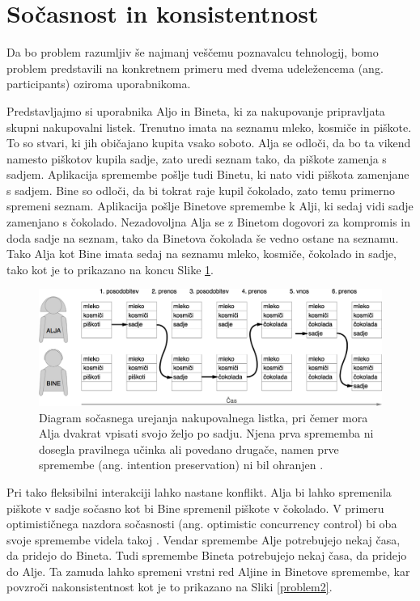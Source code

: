 \documentclass[a4paper, 12pt, twoside]{book}
\begin{document}
\section{Sočasnost in konsistentnost}
\label{sec:con}

Da bo problem razumljiv še najmanj veščemu poznavalcu tehnologij, bomo problem predstavili na konkretnem primeru \cite{problem} med dvema udeležencema (ang. participants) oziroma uporabnikoma.

Predstavljajmo si uporabnika Aljo in Bineta, ki za nakupovanje pripravljata skupni nakupovalni listek. Trenutno imata na seznamu mleko, kosmiče in piškote. To so stvari, ki jih običajano kupita vsako soboto. Alja se odloči, da bo ta vikend namesto piškotov kupila sadje, zato uredi seznam tako, da piškote zamenja s sadjem. Aplikacija spremembe pošlje tudi Binetu, ki nato vidi piškota zamenjane s sadjem. Bine so odloči, da bi tokrat raje kupil čokolado, zato temu primerno spremeni seznam. Aplikacija pošlje Binetove spremembe k Alji, ki sedaj vidi sadje zamenjano s čokolado. Nezadovoljna Alja se z Binetom dogovori za kompromis in doda sadje na seznam, tako da Binetova čokolada še vedno ostane na seznamu. Tako Alja kot Bine imata sedaj na seznamu mleko, kosmiče, čokolado in sadje, tako kot je to prikazano na koncu Slike \ref{problem1}.

\pagebreak

\begin{figure}[placement h]
\begin{center}
\includegraphics[width=16cm]{problem1.png}
\end{center}
\caption{Diagram sočasnega urejanja nakupovalnega listka, pri čemer mora Alja dvakrat vpisati svojo željo po sadju. Njena prva sprememba ni dosegla pravilnega učinka ali povedano drugače, namen prve spremembe (ang. intention preservation) ni bil ohranjen \cite{sigce}.}
\label{problem1}
\end{figure}

Pri tako fleksibilni interakciji lahko nastane konflikt. Alja bi lahko spremenila piškote v sadje sočasno kot bi Bine spremenil piškote v čokolado. V primeru optimističnega nazdora sočasnosti (ang. optimistic concurrency control) bi oba svoje spremembe videla takoj \cite{hllbw}. Vendar spremembe Alje potrebujejo nekaj časa, da pridejo do Bineta. Tudi spremembe Bineta potrebujejo nekaj časa, da pridejo do Alje. Ta zamuda lahko spremeni vrstni red Aljine in Binetove spremembe, kar povzroči nakonsistentnost kot je to prikazano na Sliki \ref{problem2}.
\end{document}
